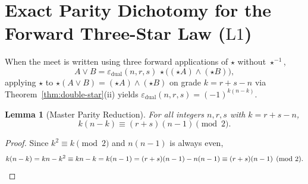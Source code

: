 \documentclass[11pt]{article}
\newtheorem{lemma}[theorem]{Lemma}
\theoremstyle{definition}
\begin{document}
\section{Exact Parity Dichotomy for the Forward Three-Star Law \texorpdfstring{($\mathrm{L1}$)}{(L1)}}

When the meet is written using three forward applications of $\star$ without $\star^{-1}$,
\begin{equation}\label{eq:forward-3star}
A \vee B = \varepsilon_{\mathrm{dual}}(n, r, s)\,\star\bigl((\star A) \wedge (\star B)\bigr),
\end{equation}
applying $\star$ to $\star(A \vee B) = (\star A) \wedge (\star B)$ on grade $k = r + s - n$ via Theorem~\ref{thm:double-star}(ii) yields $\varepsilon_{\mathrm{dual}}(n, r, s) = (-1)^{k(n-k)}$.

\begin{lemma}[Master Parity Reduction]\label{lem:parity-master}
For all integers $n, r, s$ with $k = r + s - n$,
\[
k(n - k) \equiv (r + s)(n - 1) \pmod{2}.
\]
\end{lemma}
\begin{proof}
Since $k^2 \equiv k \pmod{2}$ and $n(n - 1)$ is always even,
\[
k(n - k) = kn - k^2 \equiv kn - k = k(n - 1) = (r + s)(n - 1) - n(n - 1) \equiv (r + s)(n - 1) \pmod{2}.\qedhere
\]
\end{proof}
\end{document}
